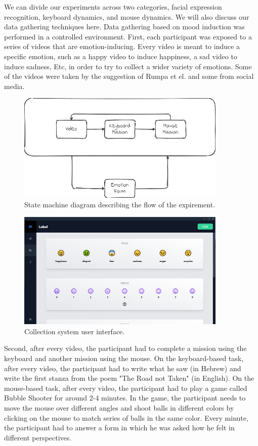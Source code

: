 
   
We can divide our experiments across two categories, facial expression recognition, keyboard dynamics, and mouse dynamics.
We will also discuss our data gathering techniques here. Data gathering based on mood induction was performed in a controlled environment. 
First, each participant was exposed to a series of videos that are emotion-inducing. 
Every video is meant to induce a specific emotion, such as a happy video to induce happiness, a sad video to induce sadness, Etc, 
in order to try to collect a wider variety of emotions.
Some of the videos were taken by the suggestion of Rumpa et el. \cite{exp_videos} and some from social media.

\begin{figure}[htp]
    \centering
    \includegraphics[width=10cm]{figures/exp_flow}   
    \caption{State machine diagram describing the flow of the expirement.}
    \label{fig:exp_flow} 
\end{figure}

\begin{figure}[htp]
    \centering
    \includegraphics[width=10cm]{figures/collection_ui}   
    \caption{Collection system user interface.}
    \label{fig:collection_ui} 
\end{figure}

Second, after every video, the participant had to complete a mission using the keyboard and another mission using the mouse. 
On the keyboard-based task, after every video, the participant had to write what he saw (in Hebrew) and write the first stanza from the poem 
"The Road not Taken" (in English). On the mouse-based task, after every video, the participant had to play a game 
called Bubble Shooter for around 2-4 minutes. In the game, the participant needs to move the mouse over different angles and 
shoot balls in different colors by clicking on the mouse to match series of balls in the same color. Every minute, 
the participant had to answer a form in which he was asked how he felt in different perspectives. 



